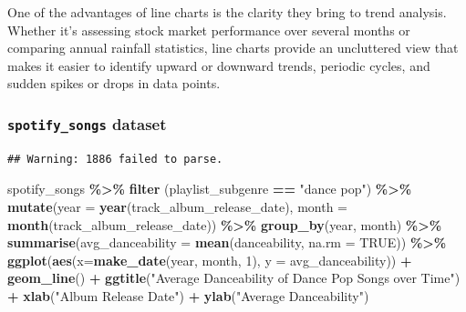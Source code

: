 \documentclass[
  b5paper]{book}
\newenvironment{Shaded}{\begin{snugshade}}{\end{snugshade}}
\newcommand{\AttributeTok}[1]{\textcolor[rgb]{0.13,0.29,0.53}{#1}}
\newcommand{\CommentTok}[1]{\textcolor[rgb]{0.56,0.35,0.01}{\textit{#1}}}
\newcommand{\ConstantTok}[1]{\textcolor[rgb]{0.56,0.35,0.01}{#1}}
\newcommand{\DecValTok}[1]{\textcolor[rgb]{0.00,0.00,0.81}{#1}}
\newcommand{\FunctionTok}[1]{\textcolor[rgb]{0.13,0.29,0.53}{\textbf{#1}}}
\newcommand{\NormalTok}[1]{#1}
\newcommand{\OtherTok}[1]{\textcolor[rgb]{0.56,0.35,0.01}{#1}}
\newcommand{\SpecialCharTok}[1]{\textcolor[rgb]{0.81,0.36,0.00}{\textbf{#1}}}
\newcommand{\StringTok}[1]{\textcolor[rgb]{0.31,0.60,0.02}{#1}}
\begin{document}
One of the advantages of line charts is the clarity they bring to trend analysis. Whether it's assessing stock market performance over several months or comparing annual rainfall statistics, line charts provide an uncluttered view that makes it easier to identify upward or downward trends, periodic cycles, and sudden spikes or drops in data points.

\hypertarget{spotify_songs-dataset-1}{%
\subsubsection*{\texorpdfstring{\texttt{spotify\_songs} dataset}{spotify\_songs dataset}}\label{spotify_songs-dataset-1}}

\begin{Shaded}
\end{Shaded}

\begin{verbatim}
## Warning: 1886 failed to parse.
\end{verbatim}

\begin{Shaded}
\begin{Highlighting}[]
\NormalTok{spotify\_songs }\SpecialCharTok{\%\textgreater{}\%}
  \FunctionTok{filter}\NormalTok{ (playlist\_subgenre }\SpecialCharTok{==} \StringTok{"dance pop"}\NormalTok{) }\SpecialCharTok{\%\textgreater{}\%}
  \FunctionTok{mutate}\NormalTok{(}\AttributeTok{year =} \FunctionTok{year}\NormalTok{(track\_album\_release\_date), }\AttributeTok{month =} \FunctionTok{month}\NormalTok{(track\_album\_release\_date)) }\SpecialCharTok{\%\textgreater{}\%}
  \FunctionTok{group\_by}\NormalTok{(year, month) }\SpecialCharTok{\%\textgreater{}\%}
  \FunctionTok{summarise}\NormalTok{(}\AttributeTok{avg\_danceability =} \FunctionTok{mean}\NormalTok{(danceability, }\AttributeTok{na.rm =} \ConstantTok{TRUE}\NormalTok{)) }\SpecialCharTok{\%\textgreater{}\%}
  \FunctionTok{ggplot}\NormalTok{(}\FunctionTok{aes}\NormalTok{(}\AttributeTok{x=}\FunctionTok{make\_date}\NormalTok{(year, month, }\DecValTok{1}\NormalTok{), }\AttributeTok{y =}\NormalTok{ avg\_danceability)) }\SpecialCharTok{+}
  \FunctionTok{geom\_line}\NormalTok{() }\SpecialCharTok{+}
  \FunctionTok{ggtitle}\NormalTok{(}\StringTok{"Average Danceability of Dance Pop Songs over Time"}\NormalTok{) }\SpecialCharTok{+}
  \FunctionTok{xlab}\NormalTok{(}\StringTok{"Album Release Date"}\NormalTok{) }\SpecialCharTok{+}
  \FunctionTok{ylab}\NormalTok{(}\StringTok{"Average Danceability"}\NormalTok{)}
\end{Highlighting}
\end{Shaded}
\end{document}
